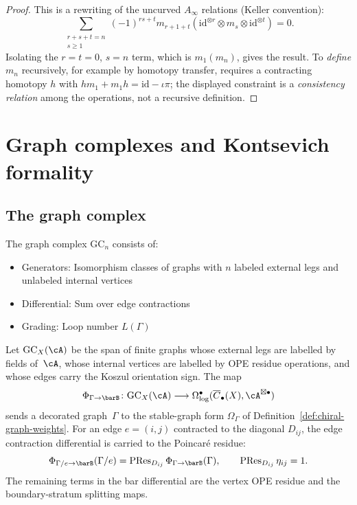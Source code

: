 \begin{proof}
This is a rewriting of the uncurved $A_\infty$ relations (Keller convention):
\[\sum_{\substack{r+s+t=n\\s\geq1}} (-1)^{rs+t} m_{r+1+t}(\mathrm{id}^{\otimes r} \otimes m_s \otimes
\mathrm{id}^{\otimes t}) = 0.\]
Isolating the $r = t = 0$, $s = n$ term, which is $m_1(m_n)$, gives the result.
To \emph{define} $m_n$ recursively, for example by homotopy transfer,
requires a contracting homotopy $h$ with $h m_1 + m_1 h = \mathrm{id} - \iota\pi$;
the displayed constraint is a \emph{consistency relation} among the operations,
not a recursive definition.
\end{proof}

\section{Graph complexes and Kontsevich formality}

\subsection{The graph complex}

\begin{definition}
The graph complex $\text{GC}_n$ consists of:
\begin{itemize}
\item Generators: Isomorphism classes of graphs with $n$ labeled external legs
and unlabeled internal vertices
\item Differential: Sum over edge contractions
\item Grading: Loop number $L(\Gamma)$
\end{itemize}
\end{definition}

\begin{definition}
\label{def:bar-graph-map}
Let \(\mathrm{GC}_X(\cA)\) be the span of finite graphs whose external
legs are labelled by fields of~\(\cA\), whose internal vertices are
labelled by OPE residue operations, and whose edges carry the Koszul
orientation sign.  The map
\[
\Phi_{\Gamma\to\barB}\colon \mathrm{GC}_X(\cA)\longrightarrow
\Omega^\bullet_{\log}(\overline{C}_\bullet(X),\cA^{\boxtimes \bullet})
\]
sends a decorated graph~\(\Gamma\) to the stable-graph form
\(\Omega_\Gamma\) of Definition~\ref{def:chiral-graph-weights}.  For an
edge \(e=(i,j)\) contracted to the diagonal \(D_{ij}\), the edge
contraction differential is carried to the Poincar\'e residue:
\[
\Phi_{\Gamma/e\to\barB}(\Gamma/e)
=\operatorname{PRes}_{D_{ij}}\Phi_{\Gamma\to\barB}(\Gamma),
\qquad
\operatorname{PRes}_{D_{ij}}\eta_{ij}=1.
\]
The remaining terms in the bar differential are the vertex OPE residue
and the boundary-stratum splitting maps.
\end{definition}

